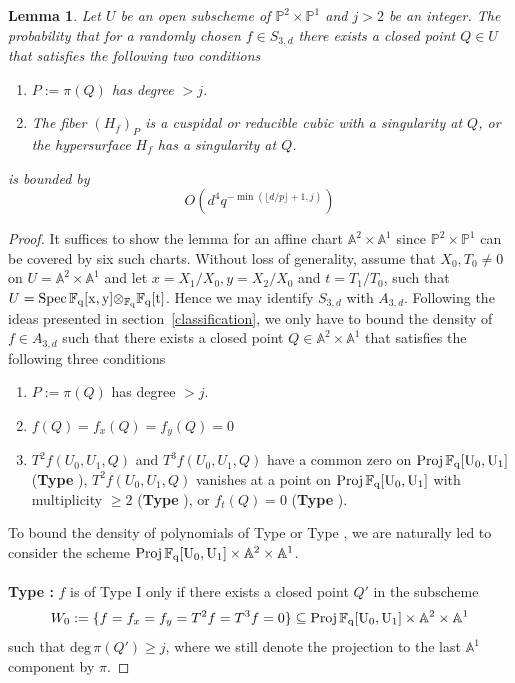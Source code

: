 \documentclass[12pt]{article}
\theoremstyle{plain}
\newtheorem{lemma}[equation]{Lemma}
\theoremstyle{definition}
\newcommand{\IA}{\mathbb{A}}
\newcommand{\IF}{\mathbb{F}}
\newcommand{\IP}{\mathbb{P}}
\renewcommand{\deg}{\mathrm{deg}\,}
\newcommand{\Spec}{\rm Spec\,}
\newcommand{\Proj}{\rm Proj\,}
\newcommand\tensor{{\otimes}}
\newcommand{\<}{\langle}
\renewcommand{\>}{\rangle}
\begin{document}
\begin{lemma}
\label{elliptichigh}
Let $U$ be an open subscheme of $\IP^2 \times \IP^1$ and $j > 2$ be an integer. The probability that for a randomly chosen $f \in S_{3, d}$ there exists a closed point $Q \in U$ that satisfies the following two conditions
\begin{enumerate}
\item $P := \pi(Q)$ has degree $> j$. 
\item The fiber $(H_f)_P$ is a cuspidal or reducible cubic with a singularity at $Q$, or the hypersurface $H_f$ has a singularity at $Q$. 
\end{enumerate}
is bounded by 
$$ O(d^4 q^{-\min(\lfloor d/p \rfloor + 1, j)}) $$
\end{lemma}

\begin{proof}
It suffices to show the lemma for an affine chart $\IA^2 \times \IA^1$ since $\IP^2 \times \IP^1$ can be covered by six such charts. Without loss of generality, assume that $X_0, T_0 \neq 0$ on $U = \IA^2 \times \IA^1$ and let $x = X_1/X_0, y = X_2/X_0$ and $t = T_1/T_0$, such that $U = \Spec \IF_q[x, y] \tensor_{\IF_q} \IF_q[t]$. Hence we may identify $S_{3, d}$ with $A_{3, d}$. Following the ideas presented in section~\ref{classification}, we only have to bound the density of $f \in A_{3, d}$ such that there exists a closed point $Q \in \IA^2 \times \IA^1$ that satisfies the following three conditions
\begin{enumerate}
\item $P := \pi(Q)$ has degree $> j$. 
\item $f(Q) = f_x(Q) = f_y(Q) = 0$
\item $T^2 f(U_0, U_1, Q)$ and $T^3 f(U_0, U_1, Q)$ have a common zero on $\Proj \IF_q[U_0, U_1]$ (\textbf{Type \uppercase\expandafter{}}), $T^2 f(U_0, U_1, Q)$ vanishes at a point on $\Proj \IF_q[U_0, U_1]$ with multiplicity $\ge 2$ (\textbf{Type \uppercase\expandafter{}}), or $f_t(Q) = 0$ (\textbf{Type \uppercase\expandafter{}}).
\end{enumerate}

To bound the density of polynomials of Type \uppercase\expandafter{} or Type \uppercase\expandafter{}, we are naturally led to consider the scheme $\Proj \IF_q[U_0, U_1] \times \IA^2 \times \IA^1$. \\\\
\textbf{Type \uppercase\expandafter{}: } $f$ is of Type I only if there exists a closed point $Q'$ in the subscheme
$$ W_0 := \{f = f_x = f_y = T^2 f = T^3 f = 0\} \subseteq \Proj \IF_q[U_0, U_1] \times \IA^2 \times \IA^1 $$
such that $\deg \pi(Q') \ge j$, where we still denote the projection to the last $\IA^1$ component by $\pi$. 


\end{proof}
\end{document}
